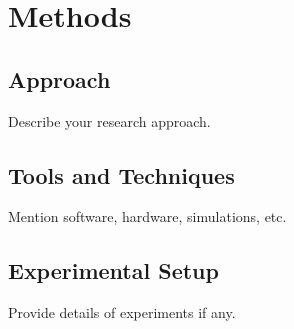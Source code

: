 \chapter{Methods}

\section{Approach}
Describe your research approach.

\section{Tools and Techniques}
Mention software, hardware, simulations, etc.

\section{Experimental Setup}
Provide details of experiments if any.
